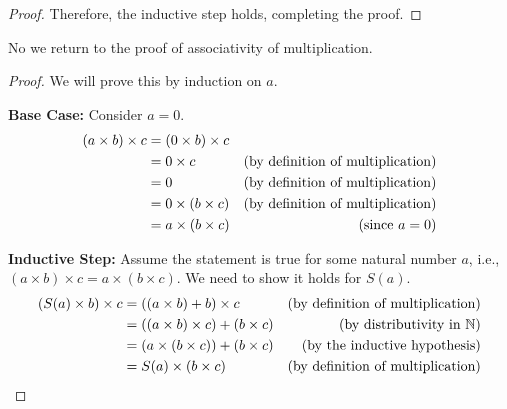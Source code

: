 \documentclass[10pt]{article}
\newcommand{\N}{\mathbb{N}}
\newenvironment{problem}[2][Problem]{\begin{trivlist}
\item[\hskip \labelsep {\bfseries #1}\hskip \labelsep {\bfseries #2.}]}{\end{trivlist}}
\begin{document}
\begin{problem}{1}
\begin{enumerate}
\begin{enumerate}
\begin{proof}
                        Therefore, the inductive step holds, completing the proof.
                    \end{proof}

                    No we return to the proof of associativity of multiplication.

                    \begin{proof}
                        We will prove this by induction on \( a \).

                        \textbf{Base Case:} Consider \( a = 0 \).
                        \begin{align*}
                            (a \times b) \times c &= (0 \times b) \times c \\
                                                  &= 0 \times c & \text{(by definition of multiplication)} \hfill \\
                                                  &= 0 & \text{(by definition of multiplication)} \hfill \\
                                                  &= 0 \times (b \times c) & \text{(by definition of multiplication)} \hfill \\
                                                  &= a \times (b \times c) & \text{(since \( a = 0 \))} \hfill
                      \end{align*}

                      \textbf{Inductive Step:} Assume the statement is true for some natural number \( a \), i.e., \( (a \times b) \times c = a \times (b \times c) \). We need to show it holds for \( S(a) \).
                      \begin{align*}
                          (S(a) \times b) \times c &= ((a \times b) + b) \times c & \text{(by definition of multiplication)} \hfill \\
                                                   &= ((a \times b) \times c) + (b \times c) & \text{(by distributivity in $\N$)} \hfill \\
                                                   &= (a \times (b \times c)) + (b \times c) & \text{(by the inductive hypothesis)} \hfill \\
                                                   &= S(a) \times (b \times c) & \text{(by definition of multiplication)} \hfill
                      \end{align*}
                    \end{proof}


\end{enumerate}
\end{enumerate}
\end{problem}
\end{document}
